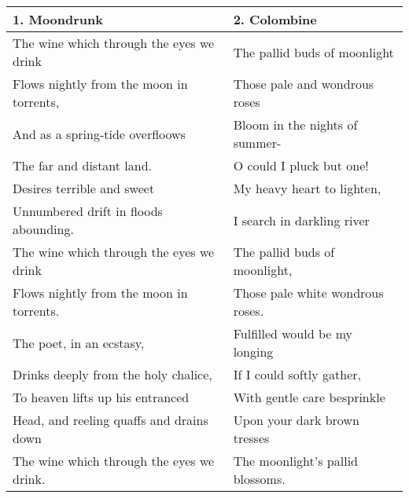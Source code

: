 
\begin{table}[h!]
\begin{tabular}{p{8.0cm}|p{8.0cm}} \hline

1. Moondrunk & 2. Colombine \\\hline
The wine which through the eyes we drink & The pallid buds of moonlight \\
Flows nightly from the moon in torrents, & Those pale and wondrous roses \\
And as a spring-tide overfloows & Bloom in the nights of summer- \\
The far and distant land. & O could I pluck but one! \\
Desires terrible and sweet & My heavy heart to lighten, \\
Unnumbered drift in floods abounding. & I search in darkling river \\
The wine which through the eyes we drink & The pallid buds of moonlight, \\
Flows nightly from the moon in torrents. & Those pale white wondrous roses. \\
The poet, in an ecstasy, & Fulfilled would be my longing \\
Drinks deeply from the holy chalice, & If I could softly gather, \\
To heaven lifts up his entranced & With gentle care besprinkle \\
Head, and reeling quaffs and drains down & Upon your dark brown tresses \\
The wine which through the eyes we drink. & The moonlight's pallid blossoms. \\\hline


\end{tabular}
\end{table}

